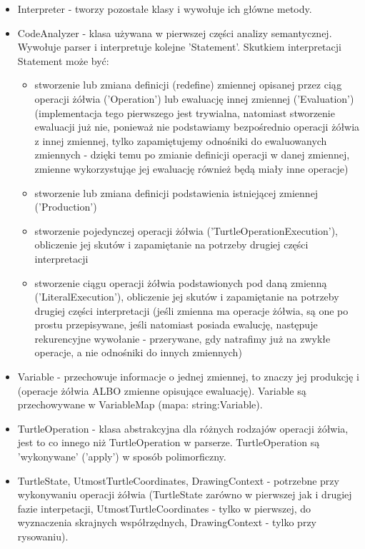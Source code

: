 \documentclass{article}
\begin{document}
\begin{itemize}
    \item{Interpreter - tworzy pozostałe klasy i wywołuje ich główne metody.}
    \item{CodeAnalyzer - klasa używana w pierwszej części analizy semantycznej. Wywołuje parser i interpretuje kolejne 'Statement'. Skutkiem interpretacji Statement może być:}
        \begin{itemize}
            \item{stworzenie lub zmiana definicji (redefine) zmiennej opisanej przez ciąg operacji żółwia ('Operation') lub ewaluację innej zmiennej ('Evaluation') (implementacja tego pierwszego jest trywialna, natomiast stworzenie ewaluacji już nie, ponieważ nie podstawiamy bezpośrednio operacji żółwia z innej zmiennej, tylko zapamiętujemy odnośniki do ewaluowanych zmiennych - dzięki temu po zmianie definicji operacji w danej zmiennej, zmienne wykorzystująe jej ewaluację również będą miały inne operacje)}
            \item{stworzenie lub zmiana definicji podstawienia istniejącej zmiennej ('Production')}
            \item{stworzenie pojedynczej operacji żółwia ('TurtleOperationExecution'), obliczenie jej skutów i zapamiętanie na potrzeby drugiej części interpretacji}
            \item{stworzenie ciągu operacji żółwia podstawionych pod daną zmienną ('LiteralExecution'), obliczenie jej skutów i zapamiętanie na potrzeby drugiej części interpretacji (jeśli zmienna ma operacje żółwia, są one po prostu przepisywane, jeśli natomiast posiada ewalucję, następuje rekurencyjne wywołanie - przerywane, gdy natrafimy już na zwykłe operacje, a nie odnośniki do innych zmiennych)}
        \end{itemize}
    \item{Variable - przechowuje informacje o jednej zmiennej, to znaczy jej produkcję i (operacje żółwia ALBO zmienne opisujące ewaluację). Variable są przechowywane w VariableMap (mapa: string:Variable).}
    \item{TurtleOperation - klasa abstrakcyjna dla różnych rodzajów operacji żółwia, jest to co innego niż TurtleOperation w parserze. TurtleOperation są 'wykonywane' ('apply') w sposób polimorficzny.}
    \item{TurtleState, UtmostTurtleCoordinates, DrawingContext - potrzebne przy wykonywaniu operacji żółwia (TurtleState zarówno w pierwszej jak i drugiej fazie interpetacji, UtmostTurtleCoordinates - tylko w pierwszej, do wyznaczenia skrajnych współrzędnych, DrawingContext - tylko przy rysowaniu).}
\end{itemize}
\end{document}
